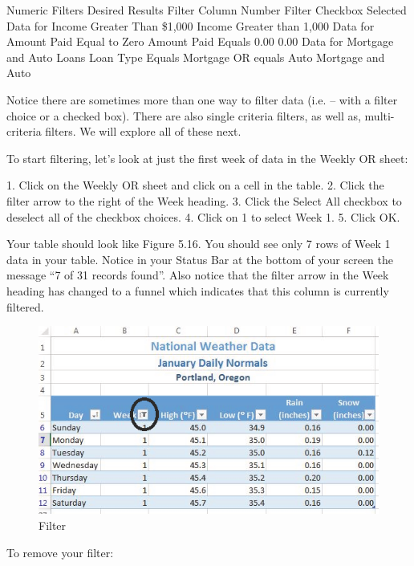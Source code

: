 Numeric Filters
Desired Results                         Filter Column Number Filter                       Checkbox Selected
Data for Income Greater Than \$1,000 Income             Greater than 1,000
Data for Amount Paid Equal to Zero      Amount Paid    Equals 0.00                        0.00
Data for Mortgage and Auto Loans        Loan Type      Equals Mortgage OR equals Auto Mortgage and Auto


Notice there are sometimes more than one way to filter data (i.e. – with a filter choice or a checked
box). There are also single criteria filters, as well as, multi-criteria filters. We will explore all of these
next.

To start filtering, let’s look at just the first week of data in the Weekly OR sheet:

1.    Click on the Weekly OR sheet and click on a cell in the table.
2.    Click the filter arrow to the right of the Week heading.
3.    Click the Select All checkbox to deselect all of the checkbox choices.
4.    Click on 1 to select Week 1.
5.    Click OK.

Your table should look like Figure 5.16. You should see only 7 rows of Week 1 data in your table.
Notice in your Status Bar at the bottom of your screen the message “7 of 31 records found”. Also
notice that the filter arrow in the Week heading has changed to a funnel which indicates that this
column is currently filtered.


\begin{figure}[H]
	\centering
	\includegraphics[width=\maxwidth{.95\linewidth}]{gfx/ch05_fig16}
	\caption{Filter}
	\label{05:fig16}
\end{figure}





To remove your filter:

